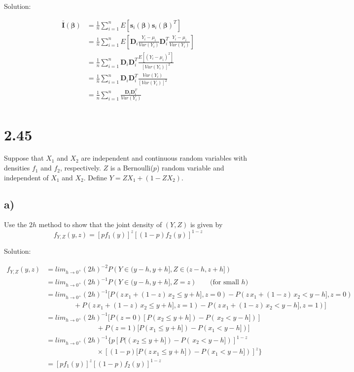 \documentclass[
  letterpaper,
  DIV=11,
  numbers=noendperiod]{scrreprt}
\begin{document}
Solution:

\[
\begin{aligned}
\bar{\mathbf I}(\boldsymbol \beta) 
&= \frac{1}{n}\sum_{i=1}^n E\left[\mathbf s_i(\boldsymbol \beta) \mathbf s_i(\boldsymbol \beta)^T\right] \\
&= \frac{1}{n}\sum_{i=1}^n E\left[\mathbf D_i\frac{Y_i - \mu_i}{Var(Y_i)}\mathbf D_i^T\frac{Y_i - \mu_i}{Var(Y_i)}\right] \\
&= \frac{1}{n}\sum_{i=1}^n \mathbf D_i \mathbf D_i^T\frac{E[(Y_i - \mu_i)^2]}{[Var(Y_i)]^2} \\
&= \frac{1}{n}\sum_{i=1}^n \mathbf D_i \mathbf D_i^T\frac{Var(Y_i)}{[Var(Y_i)]^2} \\
&= \frac{1}{n}\sum_{i=1}^n \frac{\mathbf D_i \mathbf D_i^T}{Var(Y_i)} \\
\end{aligned}
\]

\newpage

\hypertarget{section-16}{%
\section{2.45}\label{section-16}}

Suppose that \(X_1\) and \(X_2\) are independent and continuous random
variables with densities \(f_1\) and \(f_2\), respectively. \(Z\) is a
Bernoulli(\(p\)) random variable and independent of \(X_1\) and \(X_2\).
Define \(Y= ZX_1 +(1-ZX_2)\).

\hypertarget{a-1}{%
\subsection{a)}\label{a-1}}

Use the \(2h\) method to show that the joint density of \((Y,Z)\) is
given by \[f_{Y,Z}(y,z) = [pf_1(y)]^z[(1-p)f_2(y)]^{1-z}\]

Solution:

\[\begin{aligned}
f_{Y,Z} (y,z) &= lim_{h \to 0^+} (2h)^{-2} P\left(Y \in(y-h, y+h], Z \in (z-h,z+h]\right) \\
&= lim_{h \to 0^+} (2h)^{-1} P\left(Y \in(y-h, y+h], Z = z\right) ~~~~~~~~~\text{(for small }h) \\
&= lim_{h \to 0^+} (2h)^{-1} \big[P(z\,x_1+ (1-z)\,x_2 \leq y+h], z= 0) -P(z\,x_1+ (1-z)\,x_2 < y-h], z= 0) \\ &~~~~~~~~~~~~~~~~~~+
P(z\,x_1+ (1-z)\,x_2 \leq y+h], z= 1) -P(z\,x_1+ (1-z)\,x_2 < y-h], z= 1)\big] \\
&= lim_{h \to 0^+} (2h)^{-1} \big[P(z=0)[P(x_2 \leq y+h]) -P(\,x_2 < y-h])] \\&~~~~~~~~~~~~~~~~~~~~~~~~~~~~~~~~~+P(z=1)[P(x_1\leq y+h]) -P(x_1 < y-h])\big] \\
&= lim_{h \to 0^+} (2h)^{-1} \big\{p[P((x_2 \leq y+h]) -P(\,x_2 < y-h])]^{1-z} \\
&~~~~~~~~~~~~~~~~~~~~~~~~~~~~~~~~~\times\left[(1-p)[P(z\,x_1 \leq y+h]) -P(x_1 < y-h]) \right]^{z} \big\} \\
&= [pf_1(y)]^z[(1-p)f_2(y)]^{1-z}
\end{aligned}
\]
\end{document}
